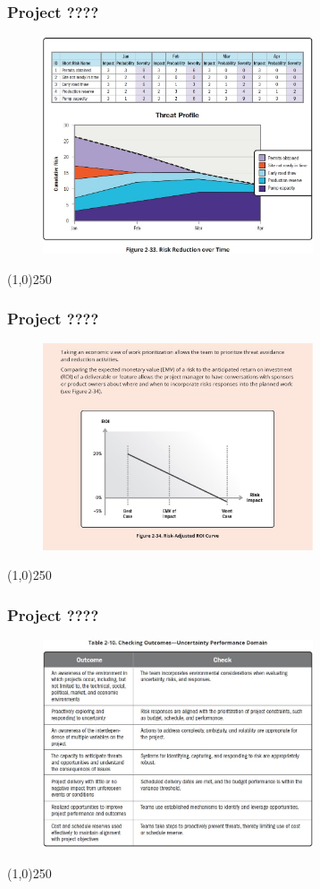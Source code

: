 \begin{frame}
\frametitle{Project ????}
 \begin{figure}
    \centering
        \includegraphics[width = 8cm]{../images/guide/Fig2-33.jpg}
    \label{guidefig:2-33}
 \end{figure}
\end{frame}
\begin{center}\line(1,0){250}\end{center}

\begin{frame}
\frametitle{Project ????}
 \begin{figure}
    \centering
        \includegraphics[width = 8cm]{../images/guide/Fig2-34.jpg}
    \label{guidefig:2-34}
 \end{figure}
\end{frame}
\begin{center}\line(1,0){250}\end{center}




\begin{frame}
\frametitle{Project ????}
 \begin{figure}
    \centering
        \includegraphics[width = 8cm]{../images/guide/Table2-10.jpg}
    \label{guideTable:2-10}
 \end{figure}
\end{frame}
\begin{center}\line(1,0){250}\end{center}




